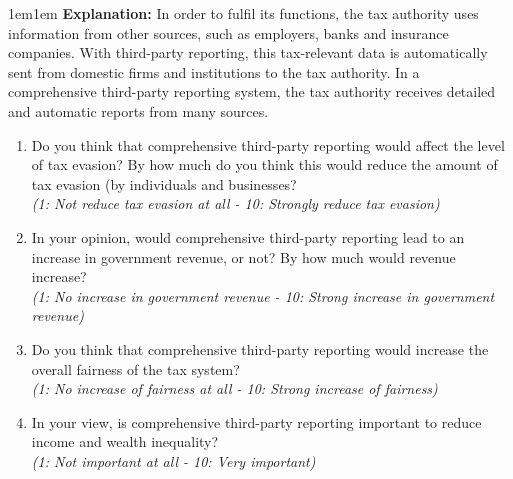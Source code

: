 \documentclass[11pt]{article}
\begin{document}
\begin{adjustwidth}{1em}{1em}  \textbf{Explanation:} In order to fulfil its functions, the tax authority uses information from other sources, such as employers, banks and insurance companies. With third-party reporting, this tax-relevant data is automatically sent from domestic firms and institutions to the tax authority. In a comprehensive third-party reporting system, the tax authority receives detailed and automatic reports from many sources.
\end{adjustwidth}
\begin{enumerate}[resume]
    \item Do you think that comprehensive third-party reporting would affect the level of tax evasion? By how much do you think this would reduce the amount of tax evasion (by individuals and businesses?\\
    \textit{(1: Not reduce tax evasion at all - 10: Strongly reduce tax evasion)}
    \item In your opinion, would comprehensive third-party reporting lead to an increase in government revenue, or not? By how much would revenue increase?  \\
    \textit{(1: No increase in government revenue - 10: Strong increase in government revenue)}
    \item Do you think that comprehensive third-party reporting would increase the overall fairness of the tax system?\\
    \textit{(1: No increase of fairness at all - 10: Strong increase of fairness)}
    \item In your view, is comprehensive third-party reporting important to reduce income and wealth inequality?\\
    \textit{(1: Not important at all - 10: Very important)}

\end{enumerate}
\end{document}
